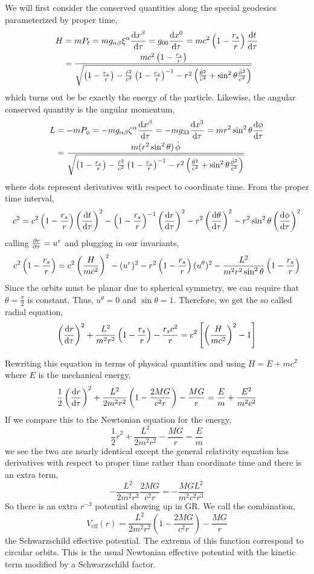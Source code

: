 \documentclass[11pt, a4paper]{article}
\begin{document}
We will first consider the conserved quantities along the special geodesics parameterized by proper time,
\begin{align*} 
H &= m P_t = m g_{\alpha \beta} \xi^\alpha \frac{\mathrm{d}x^\beta}{\mathrm{d}\tau} = g_{0 0} \frac{\mathrm{d}x^0}{\mathrm{d}\tau} = m c^2 \left(1 - \frac{r_s}{r} \right) \frac{\mathrm{d}t}{\mathrm{d}\tau}
\\
& = \frac{m c^2 \left(1 - \frac{r_s}{r} \right)}{\sqrt{\left(1 - \frac{r_s}{r} \right) - \frac{\dot{r}^2}{c^2} \left(1 - \frac{r_s}{r} \right)^{-1} - r^2 \left( \frac{\dot{\theta}^2}{c^2} + \sin^2{\theta} \frac{\dot{\phi}^2}{c^2} \right) }}
\end{align*}
which turns out be be exactly the energy of the particle. Likewise, the angular conserved quantity is the angular momentum,
\begin{align*} 
L & = - mP_\phi = -m g_{\alpha \beta} \zeta^\alpha \frac{\mathrm{d}x^\beta}{\mathrm{d}\tau} = - m g_{3 3} \frac{\mathrm{d}x^3}{\mathrm{d}\tau} = m r^2 \sin^2{\theta} \frac{\mathrm{d}\phi}{\mathrm{d}\tau} 
\\
& = \frac{m (r^2 \sin^2{\theta}) \, \dot{\phi}}{\sqrt{\left(1 - \frac{r_s}{r} \right) - \frac{\dot{r}^2}{c^2} \left(1 - \frac{r_s}{r} \right)^{-1} - r^2 \left( \frac{\dot{\theta}^2}{c^2} + \sin^2{\theta} \frac{\dot{\phi}^2}{c^2} \right) }} 
\end{align*}
where dots represent derivatives with respect to coordinate time. From the proper time interval,
\[ c^2 = c^2 \left(1 - \frac{r_s}{r} \right) \left( \frac{\mathrm{d}t}{\mathrm{d}\tau} \right)^2 - \left(1 - \frac{r_s}{r} \right)^{-1} \left( \frac{\mathrm{d}r}{\mathrm{d}\tau} \right)^2 - r^2 \left( \frac{\mathrm{d}\theta}{\mathrm{d}\tau} \right)^2 - r^2 \sin^2{\theta} \left( \frac{\mathrm{d}\phi}{\mathrm{d}\tau} \right)^2 \] 
calling $\frac{\partial{r}}{\partial{\tau}} = u^r$ and plugging in our invariants,
\[ c^2 \left(1 - \frac{r_s}{r} \right) = c^2 \left( \frac{H}{mc^2} \right)^2 - (u^r)^2 - r^2 \left(1 - \frac{r_s}{r} \right) (u^\theta)^2 - \frac{L^2}{m^2 r^2 \sin^2{\theta}} \left(1 - \frac{r_s}{r} \right)   \] 
Since the orbits must be planar due to spherical symmetry, we can require that $\theta = \frac{\pi}{2}$ is constant. Thus, $u^\theta = 0$ and $\sin{\theta} = 1$. Therefore, we get the so called radial equation,
\[ \left( \frac{\mathrm{d}r}{\mathrm{d}\tau} \right)^2 + \frac{L^2}{m^2 r^2} \left(1 - \frac{r_s}{r} \right) - \frac{r_s c^2}{r} = c^2 \left[ \left( \frac{H}{mc^2} \right)^2 - 1 \right] \]

Rewriting this equation in terms of physical quantities and using $H = E + mc^2$ where $E$ is the mechanical energy,
\[ \frac{1}{2} \left( \frac{\mathrm{d}r}{\mathrm{d}\tau} \right)^2 + \frac{L^2}{2 m^2 r^2} \left(1 - \frac{2 M G}{c^2 r} \right) - \frac{MG}{r} = \frac{E}{m} + \frac{E^2}{m^2 c^2} \] 
If we compare this to the Newtonian equation for the energy,
\[ \frac{1}{2} \dot{r}^2 + \frac{L^2}{2 m^2 r^2} - \frac{MG}{r} = \frac{E}{m} \]
we see the two are nearly identical except the general relativity equation has derivatives with respect to proper time rather than coordinate time and there is an extra term, 
\[ - \frac{L^2}{2 m^2 r^2} \frac{2 M G}{c^2 r} = - \frac{M G L^2}{m^2 c^2 r^3} \]
So there is an extra $r^{-3}$ potential showing up in GR. We call the combination,
\[ V_{\mathrm{eff}}(r) = \frac{L^2}{2 m^2 r^2} \left(1 - \frac{2 M G}{c^2 r} \right) - \frac{MG}{r} \]
the Schwarzschild effective potential. The extrema of this function correspond to circular orbits. This is the usual Newtonian effective potential with the kinetic term modified by a Schwarzschild factor.
\end{document}
